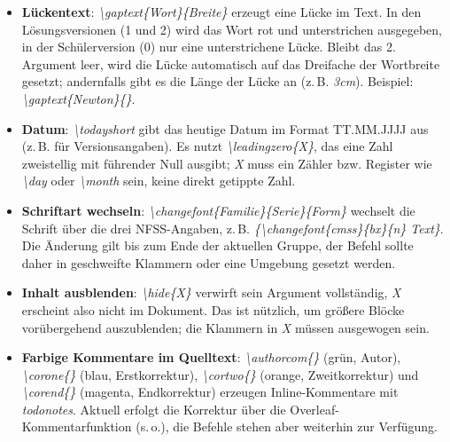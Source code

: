 \documentclass[../main.tex]{subfiles}
\begin{document}
\begin{itemize}
    \item \textbf{L\"uckentext}: \textit{\hypertarget{gaptext}{\textbackslash gaptext\{Wort\}\{Breite\}}} erzeugt eine L\"ucke im Text. In den L\"osungsversionen (1 und 2) wird das Wort rot und unterstrichen ausgegeben, in der Sch\"ulerversion (0) nur eine unterstrichene L\"ucke. Bleibt das 2. Argument leer, wird die L\"ucke automatisch auf das Dreifache der Wortbreite gesetzt; andernfalls gibt es die L\"ange der L\"ucke an (z.\,B. \textit{3cm}). Beispiel: \textit{\textbackslash gaptext\{Newton\}\{\}}.
    \item \textbf{Datum}: \textit{\hypertarget{todayshort}{\textbackslash todayshort}} gibt das heutige Datum im Format TT.MM.JJJJ aus (z.\,B. f\"ur Versionsangaben). Es nutzt \textit{\hypertarget{leadingzero}{\textbackslash leadingzero\{X\}}}, das eine Zahl zweistellig mit f\"uhrender Null ausgibt; \textit{X} muss ein Z\"ahler bzw. Register wie \textit{\textbackslash day} oder \textit{\textbackslash month} sein, keine direkt getippte Zahl.
    \item \textbf{Schriftart wechseln}: \textit{\hypertarget{changefont}{\textbackslash changefont\{Familie\}\{Serie\}\{Form\}}} wechselt die Schrift \"uber die drei NFSS-Angaben, z.\,B. \textit{\{\textbackslash changefont\{cmss\}\{bx\}\{n\} Text\}}. Die \"Anderung gilt bis zum Ende der aktuellen Gruppe, der Befehl sollte daher in geschweifte Klammern oder eine Umgebung gesetzt werden.
    \item \textbf{Inhalt ausblenden}: \textit{\hypertarget{hide}{\textbackslash hide\{X\}}} verwirft sein Argument vollst\"andig, \textit{X} erscheint also nicht im Dokument. Das ist n\"utzlich, um gr\"o\ss{}ere Blöcke vor\"ubergehend auszublenden; die Klammern in \textit{X} m\"ussen ausgewogen sein.
    \item \textbf{Farbige Kommentare im Quelltext}: \textit{\hypertarget{authorcom}{\textbackslash authorcom\{\}}} (gr\"un, Autor), \textit{\hypertarget{corone}{\textbackslash corone\{\}}} (blau, Erstkorrektur), \textit{\hypertarget{cortwo}{\textbackslash cortwo\{\}}} (orange, Zweitkorrektur) und \textit{\hypertarget{corend}{\textbackslash corend\{\}}} (magenta, Endkorrektur) erzeugen Inline-Kommentare mit \textit{todonotes}. Aktuell erfolgt die Korrektur \"uber die Overleaf-Kommentarfunktion (s.\,o.), die Befehle stehen aber weiterhin zur Verf\"ugung.
\end{itemize}


\pagebreak
\end{document}
